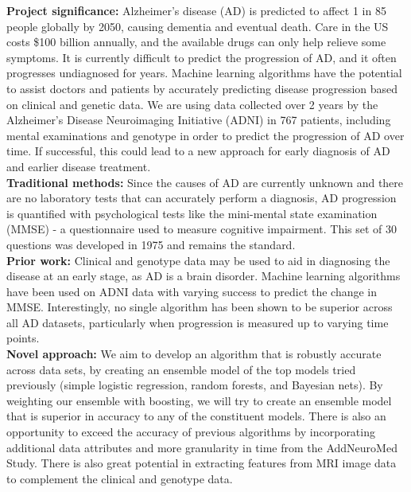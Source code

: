 \documentclass[a4paper]{article}
\begin{document}
\bigskip
\noindent 
\textbf{Project significance:} Alzheimer’s disease (AD) is predicted to affect 1 in 85 people globally by 2050, causing dementia and eventual death. Care in the US costs \$100 billion annually, and the available drugs can only help relieve some symptoms. It is currently difficult to predict the progression of AD, and it often progresses undiagnosed for years. Machine learning algorithms have the potential to assist doctors and patients by accurately predicting disease progression based on clinical and genetic data. We are using data collected over 2 years by the Alzheimer’s Disease Neuroimaging Initiative (ADNI) in 767 patients, including mental examinations and genotype in order to predict the progression of AD over time. If successful, this could lead to a new approach for early diagnosis of AD and earlier disease treatment.\\
\newline
\noindent 
\textbf{Traditional methods:} Since the causes of AD are currently unknown and there are no laboratory tests that can accurately perform a diagnosis, AD progression is quantified with psychological tests like the mini-mental state examination (MMSE) - a questionnaire used to measure cognitive impairment. This set of 30 questions was developed in 1975 and remains the standard. \\
\newline
\noindent 
\textbf{Prior work:} Clinical and genotype data may be used to aid in diagnosing the disease at an early stage, as AD is a brain disorder. Machine learning algorithms have been used on ADNI data with varying success to predict the change in MMSE. Interestingly, no single algorithm has been shown to be superior across all AD datasets, particularly when progression is measured up to varying time points.\\
\newline
\noindent 
\textbf{Novel approach: }We aim to develop an algorithm that is robustly accurate across data sets, by creating an ensemble model of the top models tried previously (simple logistic regression, random forests, and Bayesian nets). By weighting our ensemble with boosting, we will try to create an ensemble model that is superior in accuracy to any of the constituent models. There is also an opportunity to exceed the accuracy of previous algorithms by incorporating additional data attributes and more granularity in time from the AddNeuroMed Study. There is also great potential in extracting features from MRI image data to complement the clinical and genotype data.\\
\end{document}
